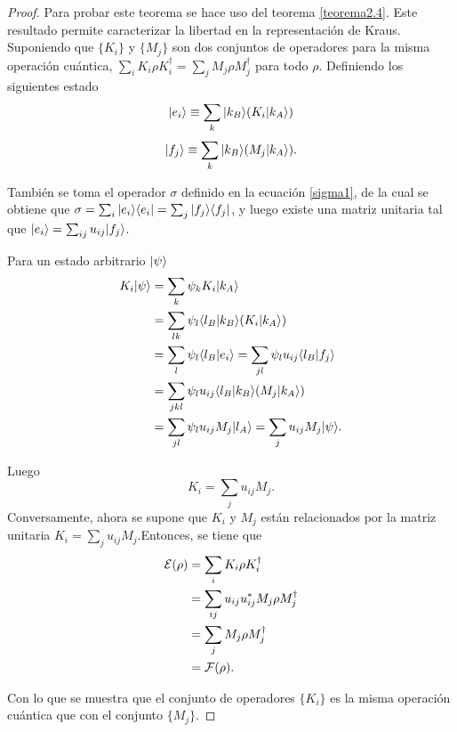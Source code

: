 \begin{proof}
Para probar este teorema se hace uso del teorema {\ref{teorema2.4}}. Este resultado permite caracterizar la libertad en la representación de Kraus. Suponiendo que $\{K_i\}$ y $\{M_j\}$ son dos conjuntos de operadores para la misma operación cuántica, $\sum_i K_i \rho K_i^\dagger= \sum_j M_j \rho M_j^\dagger$ para todo $\rho$. Definiendo los siguientes estado
\begin{equation}
    |e_i\rangle\equiv \sum_k |k_B\rangle(K_i|k_A\rangle)
\end{equation}
\begin{equation}
    |f_j\rangle\equiv \sum_k |k_B\rangle(M_j|k_A\rangle).
\end{equation}


También se toma el operador $\sigma$ definido en la ecuación {\ref{sigma1}}, de la cual se obtiene que $\sigma=\sum_i|e_i \rangle \langle e_i|=\sum_j |f_j\rangle \langle f_j|$, y luego existe una matriz unitaria tal que $  |e_i\rangle=\sum_{ij}u_{ij}|f_j\rangle$.

Para un estado arbitrario $|\psi\rangle$ 
\begin{equation}
    \begin{split}
        K_i|\psi\rangle&=\sum_k \psi_k K_i|k_A\rangle\\
                   &= \sum_{lk}\psi_l\langle l_B |k_B\rangle(K_i|k_A\rangle)\\
                   &=\sum_{l}\psi_l\langle l_B| e_i\rangle=\sum_{jl}\psi_l u_{ij}\langle l_B|f_j\rangle\\
                   &=\sum_{jkl}\psi_l u_{ij}\langle l_B|k_B\rangle(M_j|k_A\rangle)\\
                   &=\sum_{jl}\psi_l u_{ij}M_j|l_A\rangle=\sum_j u_{ij} M_j |\psi\rangle.\\
    \end{split}
\end{equation}


Luego \[K_i=\sum_j u_{ij}M_j.\] Conversamente, ahora se supone que $K_i$ y $M_j$ están relacionados por la matriz unitaria $K_i=\sum_j u_{ij}M_j$.Entonces, se tiene que
\begin{equation}
    \begin{split}
        \mathcal{E}(\rho)&=\sum_i  K_i\rho K_i^\dagger\\
            &=\sum_{ij} u_{ij}u_{ij}^*M_j\rho M_j^\dagger\\
            &=\sum_j M_j\rho M_j^\dagger\\
            &=\mathcal{F}(\rho).
    \end{split}
\end{equation}

Con lo que se muestra que el conjunto de operadores $\{K_i\}$ es la misma operación cuántica que con el conjunto $\{M_j\}$.
\end{proof}

